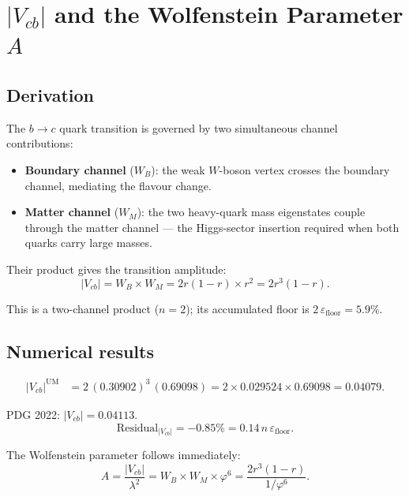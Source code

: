 \documentclass[12pt]{article}
\begin{document}
\section{$|V_{cb}|$ and the Wolfenstein Parameter $A$}

\subsection{Derivation}

The $b \to c$ quark transition is governed by two simultaneous
channel contributions:

\begin{itemize}
  \item \textbf{Boundary channel} ($W_B$): the weak $W$-boson vertex
        crosses the boundary channel, mediating the flavour change.
  \item \textbf{Matter channel} ($W_M$): the two heavy-quark mass
        eigenstates couple through the matter channel — the Higgs-sector
        insertion required when both quarks carry large masses.
\end{itemize}

Their product gives the transition amplitude:
\begin{equation}
  |V_{cb}| = W_B \times W_M = 2r(1-r) \times r^2 = 2r^3(1-r).
  \label{eq:Vcb}
\end{equation}

This is a two-channel product ($n = 2$); its accumulated floor is
$2\,\varepsilon_{\text{floor}} = 5.9\%$.

\subsection{Numerical results}

\begin{align}
  |V_{cb}|^{\text{UM}}
  &= 2\,(0.30902)^3\,(0.69098)
   = 2 \times 0.029524 \times 0.69098
   = 0.04079.
\end{align}

PDG 2022: $|V_{cb}| = 0.04113$.
\begin{equation}
  \text{Residual}_{|V_{cb}|} = -0.85\%
  = 0.14\,n\,\varepsilon_{\text{floor}}.
\end{equation}

The Wolfenstein parameter follows immediately:
\begin{equation}
  A = \frac{|V_{cb}|}{\lambda^2}
    = W_B \times W_M \times \varphi^6
    = \frac{2r^3(1-r)}{1/\varphi^6}.
  \label{eq:A}
\end{equation}
\end{document}
